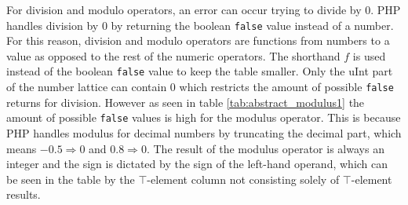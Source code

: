 \begin{table}[htbp]
\centering
{}
\caption{Abstract Subtraction}
\label{tab:abstract_subtraction1}
\end{table}


For division and modulo operators, an error can occur trying to divide by 0. PHP handles division by 0 by returning the boolean \texttt{false} value instead of a number. For this reason, division and modulo operators are functions from numbers to a value as opposed to the rest of the numeric operators. The shorthand $f$ is used instead of the boolean \texttt{false} value to keep the table smaller. Only the uInt part of the number lattice can contain 0 which restricts the amount of possible \texttt{false} returns for division. However as seen in table \ref{tab:abstract_modulus1} the amount of possible \texttt{false} values is high for the modulus operator. This is because PHP handles modulus for decimal numbers by truncating the decimal part, which means $-0.5 \Rightarrow 0$ and $0.8 \Rightarrow 0$. The result of the modulus operator is always an integer and the sign is dictated by the sign of the left-hand operand, which can be seen in the table by the $\top$-element column not consisting solely of $\top$-element results.

